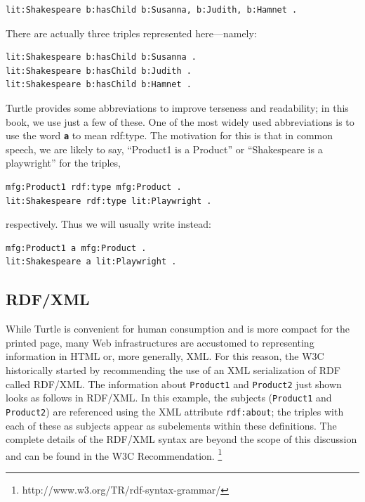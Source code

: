 \begin{lstlisting}
lit:Shakespeare b:hasChild b:Susanna, b:Judith, b:Hamnet .
\end{lstlisting}

There are actually three triples represented here---namely:

\begin{lstlisting}
lit:Shakespeare b:hasChild b:Susanna . 
lit:Shakespeare b:hasChild b:Judith . 
lit:Shakespeare b:hasChild b:Hamnet .
\end{lstlisting}

Turtle provides some abbreviations to improve terseness and readability;
in this book, we use just a few of these. One of the most widely used
abbreviations is to use the word \textbf{\texttt{a}} to mean rdf:type. The motivation for
this is that in common speech, we are likely to say, ``Product1 is a
Product'' or ``Shakespeare is a playwright'' for the triples,

\begin{lstlisting}
mfg:Product1 rdf:type mfg:Product . 
lit:Shakespeare rdf:type lit:Playwright .
\end{lstlisting}

respectively. Thus we will usually write instead:

\begin{lstlisting}
mfg:Product1 a mfg:Product . 
lit:Shakespeare a lit:Playwright .
\end{lstlisting}

\subsection{RDF/XML}

While Turtle is convenient for human consumption and is more compact for
the printed page, many Web infrastructures are accustomed to
representing information in HTML or, more generally, XML. For this
reason, the W3C historically started by recommending the use of an XML
serialization of RDF called RDF/XML. The information about \texttt{Product1} and
\texttt{Product2} just shown looks as follows in RDF/XML. In this example, the
subjects (\texttt{Product1} and \texttt{Product2}) are referenced using the XML attribute
\texttt{rdf:about}; the triples with each of these as subjects appear as
subelements within these definitions. The complete details of the
RDF/XML syntax are beyond the scope of this discussion and can be found in the W3C Recommendation. \footnote{http://www.w3.org/TR/rdf-syntax-grammar/}

